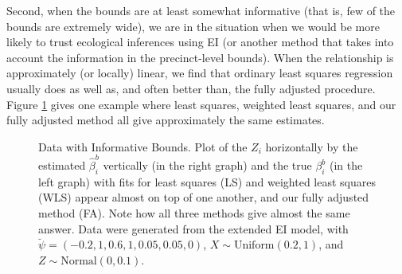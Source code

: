 \documentclass[11pt,titlepage]{article}
\begin{document}
Second, when the bounds are at least somewhat informative (that is,
few of the bounds are extremely wide), we are in the situation when we
would be more likely to trust ecological inferences using EI (or
another method that takes into account the information in the
precinct-level bounds).  When the relationship is approximately (or
locally) linear, we find that ordinary least squares regression
usually does as well as, and often better than, the fully adjusted
procedure.  Figure \ref{f:narrow} gives one example where least
squares, weighted least squares, and our fully adjusted method all
give approximately the same estimates.
\begin{figure}[t]
  \begin{center}
    \caption{Data with Informative Bounds. Plot of the $Z_i$ horizontally by
      the estimated $\hat\beta_i^b$ vertically (in the right graph)
      and the true $\beta_i^b$ (in the left graph) with fits for least
      squares (LS) and weighted least squares (WLS) appear almost on
      top of one another, and our fully adjusted method (FA).  Note
      how all three methods give almost the same answer. Data were
      generated from the extended EI model, with
      $\breve\psi=(-0.2,1,0.6,1,0.05,0.05,0)$, $X \sim
      \textrm{Uniform}(0.2,1)$, and $Z \sim \textrm{Normal}(0,0.1)$.}
    \label{f:narrow}
  \end{center}
\end{figure}
\end{document}
